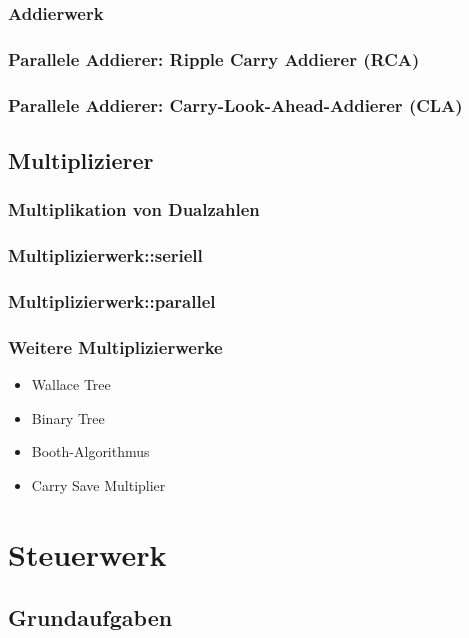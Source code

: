 \subsubsection*{Addierwerk}
\subsubsection*{Parallele Addierer: Ripple Carry Addierer (RCA)}
\subsubsection*{Parallele Addierer: Carry-Look-Ahead-Addierer (CLA)}

\subsection{Multiplizierer}
\subsubsection{Multiplikation von Dualzahlen}

\subsubsection{Multiplizierwerk::seriell}
\subsubsection{Multiplizierwerk::parallel}

\subsubsection{Weitere Multiplizierwerke}
\begin{itemize}
\item Wallace Tree
\item Binary Tree
\item Booth-Algorithmus
\item Carry Save Multiplier
\end{itemize}

\section{Steuerwerk}

\subsection*{Grundaufgaben}
